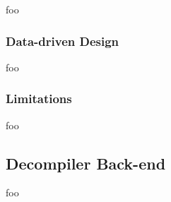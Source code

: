 
foo

\subsubsection{Data-driven Design}


foo

\subsubsection{Limitations}


foo


\subsection{Decompiler Back-end}

foo

